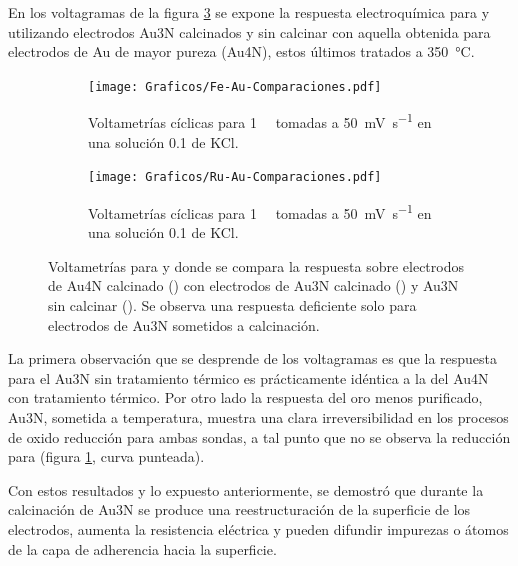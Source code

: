 			En los voltagramas de la figura \ref{Fig:Comparacion-Au} se expone la respuesta electroquímica  para \ru\space y \fe\space utilizando electrodos Au3N calcinados y sin calcinar con aquella obtenida para electrodos de Au de mayor pureza (Au4N), estos últimos tratados a \SI{350}{\celsius}. 

				\begin{figure}[ht]
		 	      \begin{subfigure}[t]{0.495\textwidth}
		          	\texttt{[image: Graficos/Fe-Au-Comparaciones.pdf]}
		         	\caption{Voltametrías cíclicas para \fe\space \SI{1}{\milli\Molar} tomadas a \SI{50}{\milli\volt\per\second} en una solución \SI{0.1}{\Molar} de KCl.}
		          	\label{fig:Fe-Au-compa}
		      		\end{subfigure}
		      	 \begin{subfigure}[t]{0.495\textwidth}
		          	\texttt{[image: Graficos/Ru-Au-Comparaciones.pdf]}
		         	\caption{Voltametrías cíclicas para \ru\space \SI{1}{\milli\Molar} tomadas a \SI{50}{\milli\volt\per\second} en una solución \SI{0.1}{\Molar} de KCl.}
		          	\label{fig:Ru-Au-compa}
		      		\end{subfigure}
		      	 \caption[Comparación entre electrodos calcinados y sin calcinar]{Voltametrías para \ferroferri\space y \aminorutenio\space donde se compara la respuesta sobre electrodos de Au4N calcinado (\usebox{\negro}) con electrodos de Au3N calcinado (\usebox{\punteado}) y Au3N sin calcinar (\usebox{\rojo}). Se observa una respuesta deficiente solo para electrodos de Au3N sometidos a calcinación.}
		      	 \label{Fig:Comparacion-Au}
	      		 \end{figure}	

			La primera observación que se desprende de los voltagramas es que la respuesta para el Au3N sin tratamiento térmico es prácticamente idéntica a la del Au4N con tratamiento térmico. Por otro lado la respuesta del oro menos purificado, Au3N, sometida a temperatura, muestra una clara irreversibilidad en los procesos de oxido reducción para ambas sondas, a tal punto que no se observa la reducción para \ferroferri\space (figura \ref{fig:Fe-Au-compa}, curva punteada).  

		    Con estos resultados y lo expuesto anteriormente, se demostró que durante la calcinación de Au3N se produce una reestructuración de la superficie de los electrodos, aumenta la resistencia eléctrica y pueden difundir impurezas o átomos de la capa de adherencia hacia la superficie. 

